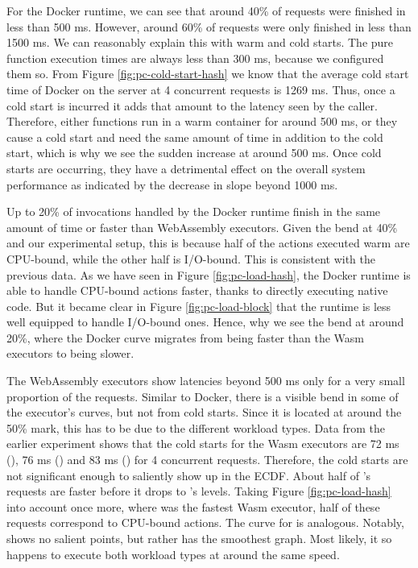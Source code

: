 For the Docker runtime, we can see that around 40\% of requests were finished in less than 500 ms. However, around 60\% of requests were only finished in less than 1500 ms. We can reasonably explain this with warm and cold starts. The pure function execution times are always less than 300 ms, because we configured them so. From Figure \ref{fig:pc-cold-start-hash} we know that the average cold start time of Docker on the server at 4 concurrent requests is 1269 ms. Thus, once a cold start is incurred it adds that amount to the latency seen by the caller. Therefore, either functions run in a warm container for around 500 ms, or they cause a cold start and need the same amount of time in addition to the cold start, which is why we see the sudden increase at around 500 ms. Once cold starts are occurring, they have a detrimental effect on the overall system performance as indicated by  the decrease in slope beyond 1000 ms.

Up to 20\% of invocations handled by the Docker runtime finish in the same amount of time or faster than WebAssembly executors. Given the bend at 40\% and our experimental setup, this is because half of the actions executed warm are CPU-bound, while the other half is I/O-bound. This is consistent with the previous data. As we have seen in Figure \ref{fig:pc-load-hash}, the Docker runtime is able to handle CPU-bound actions faster, thanks to directly executing native code. But it became clear in Figure \ref{fig:pc-load-block} that the runtime is less well equipped to handle I/O-bound ones. Hence, why we see the bend at around 20\%, where the Docker curve migrates from being faster than the Wasm executors to being slower.

The WebAssembly executors show latencies beyond 500 ms only for a very small proportion of the requests.
Similar to Docker, there is a visible bend in some of the executor's curves, but not from cold starts. Since it is located at around the 50\% mark, this has to be due to the different workload types. Data from the earlier experiment shows that the cold starts for the Wasm executors are 72 ms (), 76 ms () and 83 ms () for 4 concurrent requests. Therefore, the cold starts are not significant enough to saliently show up in the ECDF.
About half of 's requests are faster before it drops to 's levels. Taking Figure \ref{fig:pc-load-hash} into account once more, where  was the fastest Wasm executor, half of these requests correspond to CPU-bound actions. The curve for  is analogous. Notably,  shows no salient points, but rather has the smoothest graph. Most likely, it so happens to execute both workload types at around the same speed.

